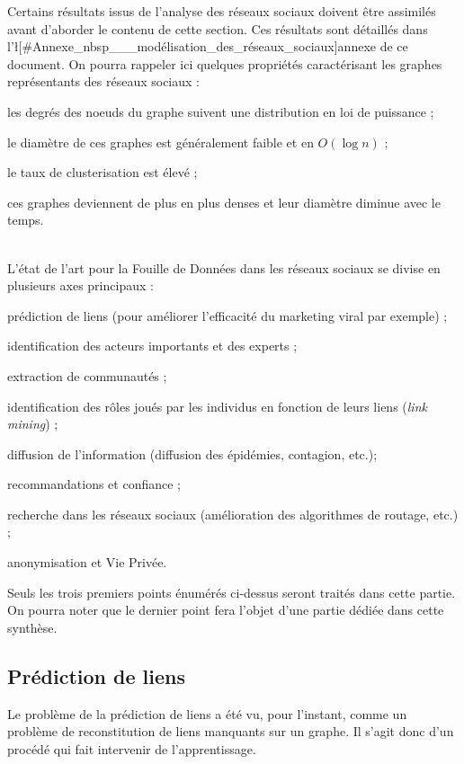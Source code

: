 Certains résultats issus de l'analyse des réseaux sociaux doivent être assimilés avant d'aborder le contenu de cette section. Ces résultats sont détaillés dans l'\l[#Annexe_nbsp___modélisation_des_réseaux_sociaux]{annexe de ce document}. On pourra rappeler ici quelques propriétés caractérisant les graphes représentants des réseaux sociaux :

\item les degrés des noeuds du graphe suivent une distribution en loi de puissance ;
\item le diamètre de ces graphes est généralement faible et en $O(\log n)$ ;
\item le taux de clusterisation est élevé ;
\item ces graphes deviennent de plus en plus denses et leur diamètre diminue avec le temps.\\

~

L'état de l'art pour la Fouille de Données dans les réseaux sociaux se divise en plusieurs axes principaux :

\item prédiction de liens (pour améliorer l'efficacité du marketing viral par exemple) ;
\item identification des acteurs importants et des experts ;
\item extraction de communautés ;
\item identification des rôles joués par les individus en fonction de leurs liens (\emph{link mining}) ;
\item diffusion de l'information (diffusion des épidémies, contagion, etc.);
\item recommandations et confiance ;
\item recherche dans les réseaux sociaux (amélioration des algorithmes de routage, etc.) ;
\item anonymisation et Vie Privée.

Seuls les trois premiers points énumérés ci-dessus seront traités dans cette partie. On pourra noter que le dernier point fera l'objet d'une partie dédiée dans cette synthèse.

\subsection{Prédiction de liens}

Le problème de la prédiction de liens a été vu, pour l'instant, comme un problème de reconstitution de liens manquants sur un graphe. Il s'agit donc d'un procédé qui fait intervenir de l'apprentissage.

